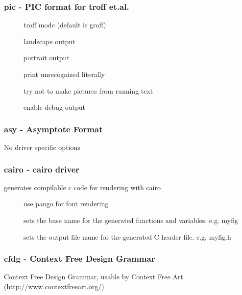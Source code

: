 \documentclass[english,a4paper]{article}
\begin{document}
\subsubsection{pic - PIC format for troff et.al.}
\begin{description}
\item[]
troff mode (default is groff)


\item[]
landscape output


\item[]
portrait output


\item[]
print unrecognized literally


\item[]
try not to make pictures from running text


\item[]
enable debug output


\end{description}
\subsubsection{asy - Asymptote Format}
No driver specific options
\subsubsection{cairo - cairo driver}
generates compilable c code for rendering with cairo

\begin{description}
\item[]
use pango for font rendering


\item[]
sets the base name for the generated functions and variables.  e.g. myfig


\item[]
sets the output file name for the generated C header file.  e.g. myfig.h


\end{description}
\subsubsection{cfdg - Context Free Design Grammar}
Context Free Design Grammar, usable by Context Free Art (http://www.contextfreeart.org/)
\end{document}

